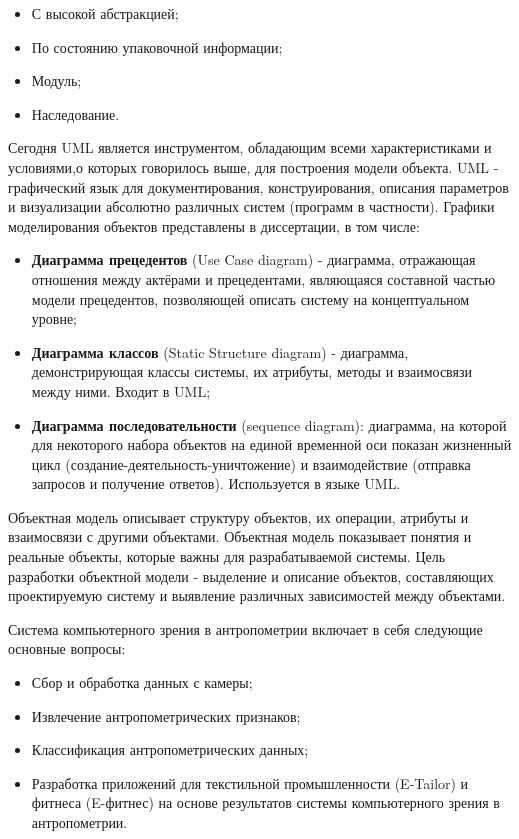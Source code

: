\begin{itemize}
	\item С высокой абстракцией;
  \item По состоянию упаковочной информации;
  \item Модуль;
  \item Наследование.

\end{itemize}
Сегодня UML является инструментом, обладающим  всеми характеристиками и условиями,о которых говорилось выше, для построения модели объекта. UML - графический язык для документирования, конструирования, описания параметров и визуализации абсолютно различных систем (программ в частности).
Графики моделирования объектов представлены в диссертации, в том числе:

\begin{itemize}
	\item \textbf{Диаграмма прецедентов} (Use Case diagram) - диаграмма, отражающая отношения между актёрами и прецедентами, являющаяся составной частью модели прецедентов, позволяющей описать систему на концептуальном уровне;
\item \textbf{Диаграмма классов} (Static Structure diagram) - диаграмма, демонстрирующая классы системы, их атрибуты, методы и взаимосвязи между ними. Входит в UML;
\item \textbf{Диаграмма последовательности} (sequence diagram): диаграмма, на которой для некоторого набора объектов на единой временной оси показан жизненный цикл (создание-деятельность-уничтожение) и взаимодействие (отправка запросов и получение ответов). Используется в языке UML.

\end{itemize}

Объектная модель описывает структуру объектов, их операции, атрибуты  и взаимосвязи с другими объектами. Объектная модель показывает понятия и реальные объекты, которые важны для разрабатываемой системы. Цель разработки объектной модели - выделение и описание объектов, составляющих проектируемую систему и выявление различных зависимостей между объектами.

Система компьютерного зрения в антропометрии включает в себя следующие основные вопросы:

\begin{itemize}
	\item Сбор и обработка данных с камеры;
	\item Извлечение антропометрических признаков;
	\item Классификация антропометрических данных;
	\item Разработка приложений для текстильной промышленности (E-Tailor) и фитнеса (E-фитнес) на основе результатов системы компьютерного зрения в антропометрии.
\end{itemize}

